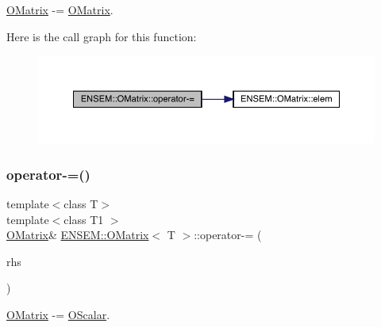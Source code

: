 \mbox{\hyperlink{classENSEM_1_1OMatrix}{O\+Matrix}} -\/= \mbox{\hyperlink{classENSEM_1_1OMatrix}{O\+Matrix}}. 

Here is the call graph for this function\+:
\nopagebreak
\begin{figure}[H]
\begin{center}
\leavevmode
\includegraphics[width=350pt]{dd/d80/classENSEM_1_1OMatrix_a4c9bcdd861f4439d1b165ec5285cf55f_cgraph}
\end{center}
\end{figure}
\mbox{\label{classENSEM_1_1OMatrix_a53a1a690a2f39f0c64c6d261efc00e4c}} 
\subsubsection{\texorpdfstring{operator-\/=()}{operator-=()}\hspace{0.1cm}{\footnotesize\ttfamily [4/6]}}
{\footnotesize\ttfamily template$<$class T$>$ \\
template$<$class T1 $>$ \\
\mbox{\hyperlink{classENSEM_1_1OMatrix}{O\+Matrix}}\& \mbox{\hyperlink{classENSEM_1_1OMatrix}{E\+N\+S\+E\+M\+::\+O\+Matrix}}$<$ T $>$\+::operator-\/= (\begin{DoxyParamCaption}\item[{const \mbox{\hyperlink{classENSEM_1_1OScalar}{O\+Scalar}}$<$ T1 $>$ \&}]{rhs }\end{DoxyParamCaption})\hspace{0.3cm}{\ttfamily [inline]}}



\mbox{\hyperlink{classENSEM_1_1OMatrix}{O\+Matrix}} -\/= \mbox{\hyperlink{classENSEM_1_1OScalar}{O\+Scalar}}. 

